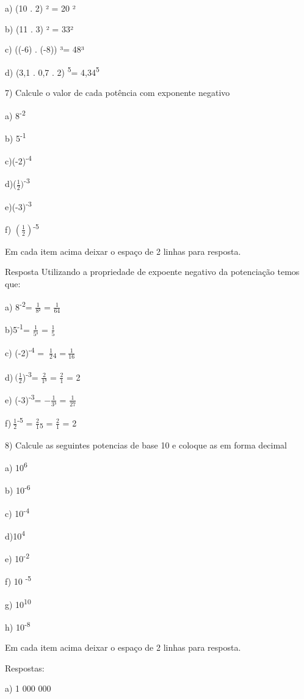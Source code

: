 {a) (10 . 2) ² = 20 ²

b) (11 . 3) ² = 33²

c) ((-6) . (-8)) ³= 48³

d) (3,1 . 0,7 . 2) \textsuperscript{5}= 4,34\textsuperscript{5}

7) Calcule o valor de cada potência com exponente negativo

a) 8\textsuperscript{-2}

b) 5\textsuperscript{-1}

c)(-2)\textsuperscript{-4}

d)(\(\frac{1}{2})\)\textsuperscript{-3}

e)(-3)\textsuperscript{-3}

f) \(\left( \frac{1}{2} \right)\)\textsuperscript{-5}

Em cada item acima deixar o espaço de 2 linhas para resposta.

Resposta Utilizando a propriedade de expoente negativo da potenciação
temos que:

a) 8\textsuperscript{-2}= \(\frac{1}{8²}\) = \(\frac{1}{64}\)

b)5\textsuperscript{-1}= \(\frac{1}{5¹}\) = \(\frac{1}{5}\)

c) (-2)\textsuperscript{-4} = \(\ \frac{1}{2}\)\textsubscript{4}
=\(\ \frac{1}{16}\)

d)\(\ (\frac{1}{2}\))\textsuperscript{-3}= \(\frac{2}{1³}\) =
\(\frac{2}{1}\) = 2

e) (-3)\textsuperscript{-3}= \(- \frac{1}{3³}\) = \(\frac{1}{27}\)

f)\(\ \frac{1}{2}\)\textsuperscript{-5} =
\(\frac{2}{1}\)\textsubscript{5} = \(\frac{2}{1}\) = 2

8) Calcule as seguintes potencias de base 10 e coloque as em forma
decimal

a) 10\textsuperscript{6}

b) 10\textsuperscript{-6}

c) 10\textsuperscript{-4}

d)10\textsuperscript{4}

e) 10\textsuperscript{-2}

f) 10 \textsuperscript{-5}

g) 10\textsuperscript{10}

h) 10\textsuperscript{-8}

Em cada item acima deixar o espaço de 2 linhas para resposta.

Respostas:

a) 1 000 000

}
